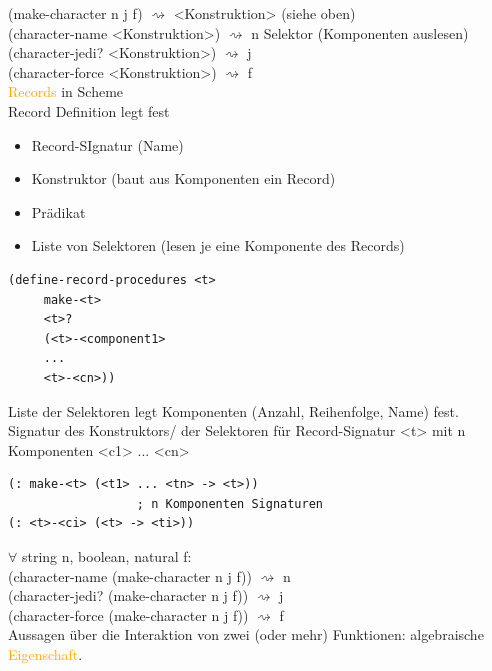 \documentclass[paper=a4, fontsize=11pt]{scrartcl}
\numberwithin{equation}{section}
\numberwithin{figure}{section}
\numberwithin{table}{section}
\begin{document}
(make-character n j f) $\rightsquigarrow$ <Konstruktion> (siehe oben) \\
(character-name <Konstruktion>) $\rightsquigarrow$ n Selektor (Komponenten auslesen) \\
(character-jedi? <Konstruktion>) $\rightsquigarrow$ j \\
(character-force <Konstruktion>) $\rightsquigarrow$ f \\

\textcolor{orange}{Records} in Scheme \\
Record Definition legt fest 
\begin{itemize}
\item Record-SIgnatur (Name)
\item Konstruktor (baut aus Komponenten ein Record)
\item Prädikat
\item Liste von Selektoren (lesen je eine Komponente des Records)
\end{itemize}

\begin{lstlisting}
(define-record-procedures <t>
     make-<t>
     <t>?
     (<t>-<component1>
     ...
     <t>-<cn>))
\end{lstlisting}

Liste der Selektoren legt Komponenten (Anzahl, Reihenfolge, Name) fest. \\
Signatur des Konstruktors/ der Selektoren für Record-Signatur <t> mit n Komponenten <c1> ... <cn> 
\begin{lstlisting}
(: make-<t> (<t1> ... <tn> -> <t>))
                  ; n Komponenten Signaturen
(: <t>-<ci> (<t> -> <ti>))                  
\end{lstlisting}
$\forall$ string n, boolean, natural f: \\
(character-name (make-character n j f)) $\rightsquigarrow$ n \\
(character-jedi? (make-character n j f)) $\rightsquigarrow$ j \\
(character-force (make-character n j f)) $\rightsquigarrow$ f \\

Aussagen über die Interaktion von zwei (oder mehr) Funktionen: algebraische \textcolor{orange}{Eigenschaft}. \\
\end{document}
